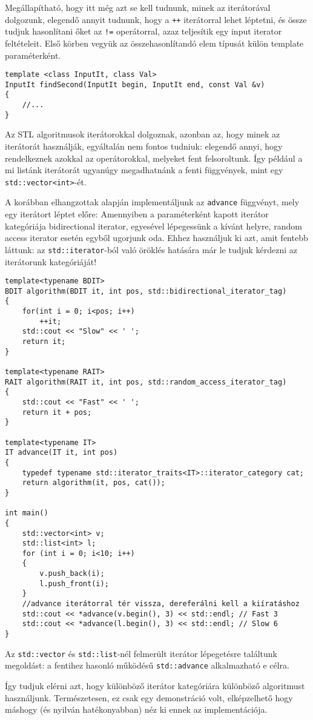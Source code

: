 \documentclass[a4paper,11.5pt,table]{article}
\begin{document}
	\smallskip
	Megállapítható, hogy itt még azt se kell tudnunk, minek az iterátorával dolgozunk, elegendő annyit tudnunk, hogy a \texttt{++} iterátorral lehet léptetni, és össze tudjuk hasonlítani őket az \texttt{!=} operátorral, azaz teljesítik egy input iterator feltételeit. Első körben vegyük az összehasonlítandó elem típusát külön template paraméterként.
	\begin{lstlisting}
template <class InputIt, class Val>
InputIt findSecond(InputIt begin, InputIt end, const Val &v)
{
	//...
}
	\end{lstlisting}
	
	Az STL algoritmusok iterátorokkal dolgoznak, azonban az, hogy minek az iterátorát használják, egyáltalán nem fontos tudniuk: elegendő annyi, hogy rendelkeznek azokkal az operátorokkal, melyeket fent felsoroltunk. Így például a mi listánk iterátorát ugyanúgy megadhatnánk a fenti függvények, mint egy \texttt{std::vector<int>}-ét.
	
	\medskip
	A korábban elhangzottak alapján implementáljunk az \texttt{advance} függvényt, mely egy iterátort léptet előre: Amennyiben a paraméterként kapott iterátor kategóriája bidirectional iterator, egyesével lépegessünk a kívánt helyre, random access iterator esetén egyből ugorjunk oda.  Ehhez használjuk ki azt, amit fentebb láttunk: az \texttt{std::iterator}-ból való öröklés hatására már le tudjuk kérdezni az iterátorunk kategóriáját!
	\begin{lstlisting}
template<typename BDIT> 
BDIT algorithm(BDIT it, int pos, std::bidirectional_iterator_tag) 
{
	for(int i = 0; i<pos; i++)
		++it;
	std::cout << "Slow" << ' ';
	return it;
}

template<typename RAIT>
RAIT algorithm(RAIT it, int pos, std::random_access_iterator_tag) 
{
	std::cout << "Fast" << ' ';
	return it + pos;
}

template<typename IT> 
IT advance(IT it, int pos) 
{
	typedef typename std::iterator_traits<IT>::iterator_category cat;
	return algorithm(it, pos, cat());
}

int main() 
{
	std::vector<int> v;
	std::list<int> l;
	for (int i = 0; i<10; i++)
	{
		v.push_back(i);
		l.push_front(i);
	}
	//advance iterátorral tér vissza, dereferálni kell a kiíratáshoz
	std::cout << *advance(v.begin(), 3) << std::endl; // Fast 3
	std::cout << *advance(l.begin(), 3) << std::endl; // Slow 6
}  
	\end{lstlisting}
	\begin{note}
		Az \texttt{std::vector} és \texttt{std::list}-nél felmerült iterátor lépegetésre találtunk megoldást: a fentihez hasonló működésű \texttt{std::advance} alkalmazható e célra.
	\end{note}
	Így tudjuk elérni azt, hogy különböző iterátor kategóriára különböző algoritmust használjunk. Természetesen, ez csak egy demonstráció volt, elképzelhető hogy máshogy (és nyilván hatékonyabban) néz ki ennek az implementációja.
	\medskip
	
\end{document}
